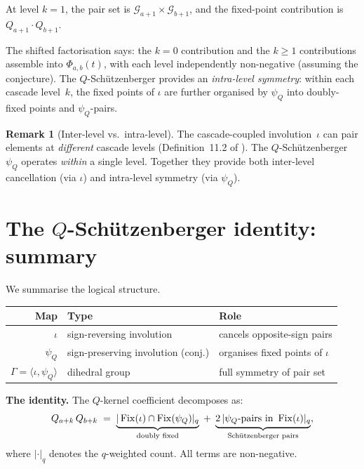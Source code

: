 \documentclass[11pt]{article}
\DeclareMathOperator{\Fix}{Fix}
\theoremstyle{plain}
\theoremstyle{definition}
\newtheorem{remark}[theorem]{Remark}
\begin{document}
At level $k = 1$, the pair set is
$\mathcal{G}_{a+1} \times \mathcal{G}_{b+1}$, and the
fixed-point contribution is $Q_{a+1} \cdot Q_{b+1}$.

The shifted factorisation says: the $k = 0$ contribution and
the $k \geq 1$ contributions assemble into $\Phi_{a,b}(t)$,
with each level independently non-negative (assuming the
conjecture).  The $Q$-Sch\"utzenberger provides an
\emph{intra-level symmetry}: within each cascade level~$k$,
the fixed points of $\iota$ are further organised by
$\psi_Q$ into doubly-fixed points and $\psi_Q$-pairs.

\begin{remark}[Inter-level vs.\ intra-level]
\label{rem:inter-intra}
The cascade-coupled involution~$\iota$ can pair elements at
\emph{different} cascade levels (Definition~11.2 of
\cite{LOCAL_RULE}).  The $Q$-Sch\"utzenberger~$\psi_Q$
operates \emph{within} a single level.  Together they provide
both inter-level cancellation (via $\iota$) and intra-level
symmetry (via $\psi_Q$).
\end{remark}


\section{The $Q$-Sch\"utzenberger identity: summary}
\label{sec:summary}

We summarise the logical structure.

\begin{center}
\begin{tabular}{r|l|l}
\textbf{Map} & \textbf{Type} & \textbf{Role} \\ \hline
$\iota$ & sign-reversing involution &
  cancels opposite-sign pairs \\
$\psi_Q$ & sign-preserving involution (conj.) &
  organises fixed points of $\iota$ \\
$\Gamma = \langle \iota, \psi_Q \rangle$ &
  dihedral group & full symmetry of pair set
\end{tabular}
\end{center}

\medskip
\noindent\textbf{The identity.}\;
The $Q$-kernel coefficient decomposes as:
\[
  Q_{a+k}\, Q_{b+k}
  \;=\;
  \underbrace{|\Fix(\iota) \cap \Fix(\psi_Q)|_q}_{%
    \text{doubly fixed}}
  \;+\;
  \underbrace{2\, |\text{$\psi_Q$-pairs in } \Fix(\iota)|_q}_{%
    \text{Sch\"utzenberger pairs}},
\]
where $|\cdot|_q$ denotes the $q$-weighted count.  All terms
are non-negative.
\end{document}
